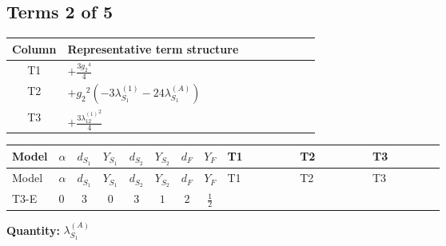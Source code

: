 \documentclass[8pt]{article}
\begin{document}
\begin{landscape}
\subsection*{Terms 2 of 5}
\begin{center}
\begin{tabular}{@{}c >{\raggedright\arraybackslash}p{0.82\linewidth}@{}}
\toprule
Column & Representative term structure \\
\midrule
T1 & \(\displaystyle +\frac{3 {g_2}^4}{4}\) \\
\midrule
T2 & \(\displaystyle +{g_2}^2 (-3 {\lambda_{S_1}^{(1)}}-24 {\lambda_{S_1}^{(A)}})\) \\
\midrule
T3 & \(\displaystyle +\frac{3 {\lambda_{12}^{(1)}}^2}{4}\) \\
\midrule
\bottomrule
\end{tabular}
\end{center}
\smallskip
\tiny
\begin{longtable}{@{}llcccccc >{\raggedright\arraybackslash}p{0.21\linewidth} >{\raggedright\arraybackslash}p{0.21\linewidth} >{\raggedright\arraybackslash}p{0.21\linewidth}@{}}
\toprule
Model & $\alpha$ & $d_{S_1}$ & $Y_{S_1}$ & $d_{S_2}$ & $Y_{S_2}$ & $d_F$ & $Y_F$ & T1 & T2 & T3 \\
\midrule
\endfirsthead
\toprule
Model & $\alpha$ & $d_{S_1}$ & $Y_{S_1}$ & $d_{S_2}$ & $Y_{S_2}$ & $d_F$ & $Y_F$ & T1 & T2 & T3 \\
\midrule
\endhead
T3-E & $0$ & $3$ & $0$ & $3$ & $1$ & $2$ & $\frac{1}{2}$ & \scriptsize\adjustbox{max width=\linewidth}{$\begin{gathered} +\frac{3 {g_2}^4}{4}\end{gathered}$} & \scriptsize\adjustbox{max width=\linewidth}{$\begin{gathered} +{g_2}^2 (-3 {\lambda_{S_1}^{(1)}}-24 {\lambda_{S_1}^{(A)}})\end{gathered}$} & \scriptsize\adjustbox{max width=\linewidth}{$\begin{gathered} +\frac{3 {\lambda_{12}^{(1)}}^2}{4}\end{gathered}$} \\
\midrule
\bottomrule
\end{longtable}
\clearpage
\noindent\textbf{Quantity: }$\lambda_{S_1}^{(A)}$\par\smallskip

\end{landscape}
\end{document}
